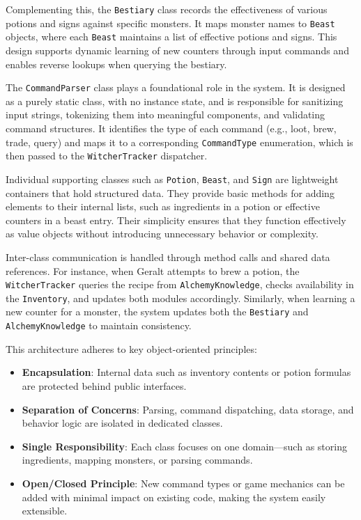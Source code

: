 \documentclass{article}
\begin{document}
Complementing this, the \texttt{Bestiary} class records the effectiveness of various potions and signs against specific monsters. It maps monster names to \texttt{Beast} objects, where each \texttt{Beast} maintains a list of effective potions and signs. This design supports dynamic learning of new counters through input commands and enables reverse lookups when querying the bestiary.

The \texttt{CommandParser} class plays a foundational role in the system. It is designed as a purely static class, with no instance state, and is responsible for sanitizing input strings, tokenizing them into meaningful components, and validating command structures. It identifies the type of each command (e.g., loot, brew, trade, query) and maps it to a corresponding \texttt{CommandType} enumeration, which is then passed to the \texttt{WitcherTracker} dispatcher.

Individual supporting classes such as \texttt{Potion}, \texttt{Beast}, and \texttt{Sign} are lightweight containers that hold structured data. They provide basic methods for adding elements to their internal lists, such as ingredients in a potion or effective counters in a beast entry. Their simplicity ensures that they function effectively as value objects without introducing unnecessary behavior or complexity.

Inter-class communication is handled through method calls and shared data references. For instance, when Geralt attempts to brew a potion, the \texttt{WitcherTracker} queries the recipe from \texttt{AlchemyKnowledge}, checks availability in the \texttt{Inventory}, and updates both modules accordingly. Similarly, when learning a new counter for a monster, the system updates both the \texttt{Bestiary} and \texttt{AlchemyKnowledge} to maintain consistency.

This architecture adheres to key object-oriented principles:
\begin{itemize}
    \item \textbf{Encapsulation}: Internal data such as inventory contents or potion formulas are protected behind public interfaces.
    \item \textbf{Separation of Concerns}: Parsing, command dispatching, data storage, and behavior logic are isolated in dedicated classes.
    \item \textbf{Single Responsibility}: Each class focuses on one domain—such as storing ingredients, mapping monsters, or parsing commands.
    \item \textbf{Open/Closed Principle}: New command types or game mechanics can be added with minimal impact on existing code, making the system easily extensible.
\end{itemize}
\end{document}
